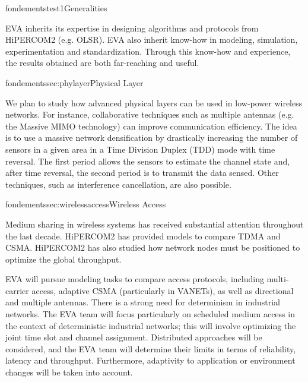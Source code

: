 \documentclass{ra2016}
\begin{document}
\begin{module}{fondements}{test1}{Generalities}

EVA inherits its expertise in designing  algorithms and protocols from HiPERCOM2 (e.g. OLSR).
EVA also inherit know-how in modeling, simulation, experimentation and standardization.
Through this know-how and experience, the results obtained are both far-reaching and useful.

\end{module}

\begin{module}{fondements}{sec:phylayer}{Physical Layer}

We plan to study how advanced physical layers can be used in low-power wireless networks.
For instance, collaborative techniques such as multiple antennas (e.g. the Massive MIMO technology) can improve communication efficiency.   
The idea is to use a massive network densification by drastically increasing the number of sensors in a given area in a Time Division Duplex (TDD) mode with time reversal.
The first period allows the sensors to estimate the channel state and, after time reversal, the second period is to transmit the data sensed.
Other techniques, such as interference cancellation, are also possible.

\end{module}

\begin{module}{fondements}{sec:wirelessaccess}{Wireless Access}

Medium sharing in wireless systems has received substantial attention throughout the last decade.
HiPERCOM2 has provided models to compare TDMA and CSMA.
HiPERCOM2 has also studied how network nodes must be positioned to optimize the global throughput.

EVA will pursue modeling tasks to compare access protocols, including multi-carrier access, adaptive CSMA (particularly in VANETs), as well as directional and multiple antennas.
There is a strong need for determinism in industrial networks.
The EVA team will focus particularly on scheduled medium access in the context of deterministic industrial networks; this will involve optimizing the joint time slot and channel assignment.
Distributed approaches will be considered, and the EVA team will determine their limits in terms of reliability, latency and throughput.
Furthermore, adaptivity to application or environment changes will be taken into account.

\end{module}
\end{document}
